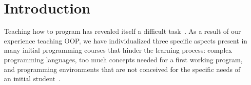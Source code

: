 \section{Introduction}
\label{sec:intro}




Teaching how to program has revealed itself a difficult task~\cite{dijkstra_89a, jenkins2002difficulty}.
As a result of our experience teaching OOP, we have individualized three specific aspects present in many initial programming courses that hinder  the learning process: 
complex programming languages,
too much concepts needed for a first working program, and
programming environments that are not conceived for the specific needs of an initial student~\cite{singh2012}.




